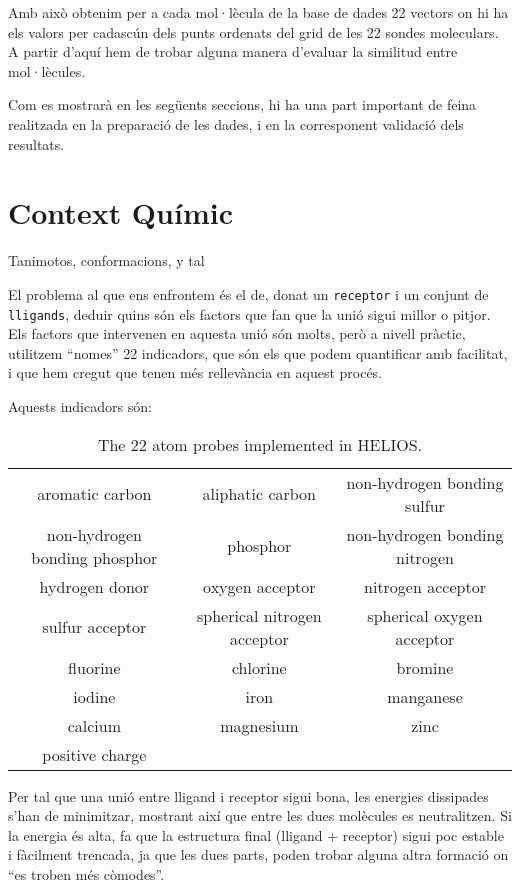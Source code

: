 \documentclass[titlepage,a4paper,12pt]{book}
\begin{document}
Amb això obtenim per a cada mol·lècula de la base de dades 22 vectors on hi ha els valors per cadascún dels punts ordenats del grid de les 22 sondes moleculars. A partir d'aquí hem de trobar alguna manera d'evaluar la similitud entre mol·lècules.

Com es mostrarà en les següents seccions, hi ha una part important de feina
realitzada en la preparació de les dades, i en la corresponent validació dels
resultats.


\section{Context Químic} %
\label{sec:Context Quimic}
Tanimotos, conformacions, y tal 

El problema al que ens enfrontem és el de, donat un \texttt{receptor} i un conjunt de %
\texttt{lligands}, deduir quins són els factors que fan que la unió sigui millor
o pitjor.  Els factors que intervenen en aquesta unió són molts, però a nivell
pràctic, utilitzem ``nomes'' 22 indicadors, que són els que podem quantificar
amb facilitat, i que hem cregut que tenen més rellevància en aquest procés.

Aquests indicadors són:

\begin{table}
\centering
\begin{tabular}{|ccc|}
\hline
aromatic carbon &aliphatic carbon&non-hydrogen bonding sulfur\\
non-hydrogen bonding phosphor&phosphor&non-hydrogen bonding nitrogen\\
hydrogen donor&oxygen acceptor&nitrogen acceptor\\
sulfur acceptor&spherical nitrogen acceptor&spherical oxygen acceptor\\
fluorine&chlorine&bromine\\
iodine&iron&manganese\\
calcium&magnesium&zinc\\
positive charge&& \\
\hline
\end{tabular}
\caption{The 22 atom probes implemented in HELIOS.}
\label{table:maps}
\end{table}

Per tal que una unió entre lligand i receptor sigui bona, les energies
dissipades s'han de minimitzar, mostrant així que entre les dues molècules es
neutralitzen.  Si la energia és alta, fa que la estructura final (lligand +
receptor) sigui poc estable i fàcilment trencada, ja que les dues parts, poden
trobar alguna altra formació on ``es troben més còmodes''.
\end{document}
